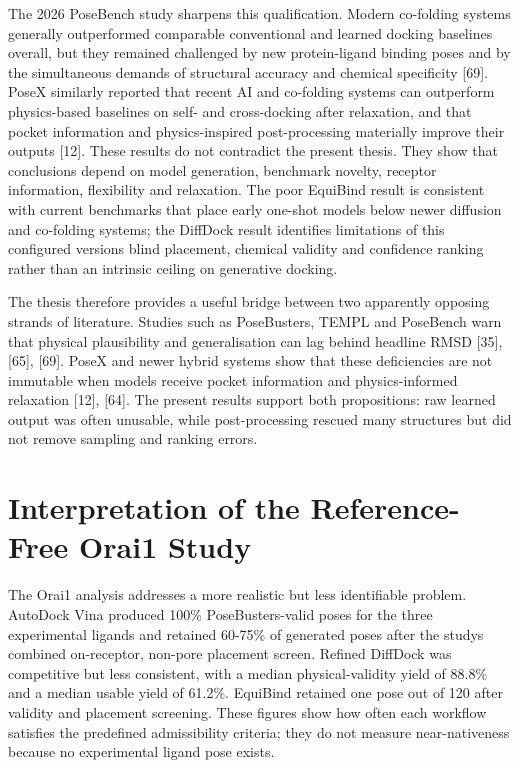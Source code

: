 The 2026 PoseBench study sharpens this qualification. Modern co-folding systems generally outperformed comparable conventional and learned docking baselines overall, but they remained challenged by new protein-ligand binding poses and by the simultaneous demands of structural accuracy and chemical specificity {[}69{]}. PoseX similarly reported that recent AI and co-folding systems can outperform physics-based baselines on self- and cross-docking after relaxation, and that pocket information and physics-inspired post-processing materially improve their outputs {[}12{]}. These results do not contradict the present thesis. They show that conclusions depend on model generation, benchmark novelty, receptor information, flexibility and relaxation. The poor EquiBind result is consistent with current benchmarks that place early one-shot models below newer diffusion and co-folding systems; the DiffDock result identifies limitations of this configured version\textquotesingle s blind placement, chemical validity and confidence ranking rather than an intrinsic ceiling on generative docking.

The thesis therefore provides a useful bridge between two apparently opposing strands of literature. Studies such as PoseBusters, TEMPL and PoseBench warn that physical plausibility and generalisation can lag behind headline RMSD {[}35{]}, {[}65{]}, {[}69{]}. PoseX and newer hybrid systems show that these deficiencies are not immutable when models receive pocket information and physics-informed relaxation {[}12{]}, {[}64{]}. The present results support both propositions: raw learned output was often unusable, while post-processing rescued many structures but did not remove sampling and ranking errors.

\hypertarget{interpretation-of-the-reference-free-orai1-study}{%
\section{Interpretation of the Reference-Free Orai1 Study}\label{interpretation-of-the-reference-free-orai1-study}}

The Orai1 analysis addresses a more realistic but less identifiable problem. AutoDock Vina produced 100\% PoseBusters-valid poses for the three experimental ligands and retained 60-75\% of generated poses after the study\textquotesingle s combined on-receptor, non-pore placement screen. Refined DiffDock was competitive but less consistent, with a median physical-validity yield of 88.8\% and a median usable yield of 61.2\%. EquiBind retained one pose out of 120 after validity and placement screening. These figures show how often each workflow satisfies the predefined admissibility criteria; they do not measure near-nativeness because no experimental ligand pose exists.

